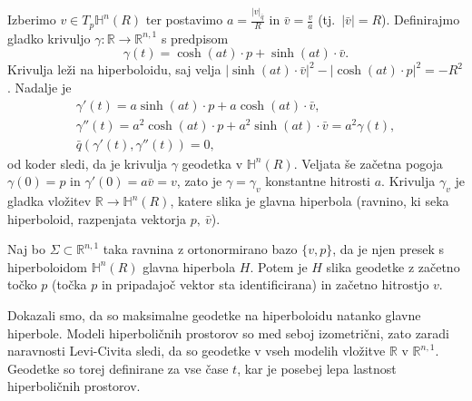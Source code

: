 \documentclass[a4paper]{article}
\begin{document}
Izberimo $v \in T_{p}\mathbb{H}^{n}(R)$ ter postavimo $a=\frac{|v|_{\bar{q}}}{R}$ in $\bar{v}=\frac{v}{a}$ (tj.~$|\bar{v}|=R$).
Definirajmo gladko krivuljo $\gamma \colon \mathbb{R} \to \mathbb{R}^{n,1}$ s predpisom
\[ \gamma(t) = \cosh(at) \cdot p + \sinh(at) \cdot \bar{v}. \]
Krivulja leži na hiperboloidu, saj velja $ |\sinh(at) \cdot \bar{v}|^2 - |\cosh(at) \cdot p|^2 = -R^2$. Nadalje je 
\begin{gather*}
\gamma'(t) = a\sinh(at) \cdot p + a\cosh(at) \cdot \bar{v}, \\
\gamma''(t) = a^2\cosh(at) \cdot p + a^2\sinh(at) \cdot \bar{v} = a^2 \gamma(t), \\
\bar{q}(\gamma'(t), \gamma''(t)) = 0,
\end{gather*}
od koder sledi, da je krivulja $\gamma$ geodetka v $\mathbb{H}^{n}(R)$.
Veljata še začetna pogoja $\gamma(0)=p$ in $\gamma'(0)=a\bar{v}=v$, zato je $\gamma = \gamma_{v}$ konstantne hitrosti $a$.
Krivulja $\gamma_{v}$ je gladka vložitev $\mathbb{R} \to \mathbb{H}^{n}(R)$, katere slika je glavna hiperbola (ravnino, ki seka hiperboloid, razpenjata vektorja $p, \ \bar{v}$).

Naj bo $\Sigma \subset \mathbb{R}^{n,1}$ taka ravnina z ortonormirano bazo $\{v,p\}$, da je njen presek s hiperboloidom $\mathbb{H}^{n}(R)$ glavna hiperbola $H$. Potem je $H$ slika geodetke z začetno točko $p$ (točka $p$ in pripadajoč vektor sta identificirana) in začetno hitrostjo $v$.\newline

Dokazali smo, da so maksimalne geodetke na hiperboloidu natanko glavne hiperbole. Modeli hiperboličnih prostorov so med seboj izometrični, zato zaradi naravnosti Levi-Civita sledi, da so geodetke v vseh modelih vložitve $\mathbb{R}$ v $\mathbb{R}^{n,1}$. Geodetke so torej definirane za vse čase $t$, kar je posebej lepa lastnost hiperboličnih prostorov.\newline
\end{document}
